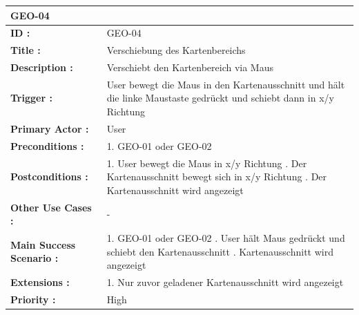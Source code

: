 	\begin{table}[H]
		\begin{tabular}{|p{8cm}|p{8cm}|}
			\hline
			\textbf{GEO-04 } \\ 
			\hline
			\textbf{ID :}\centering & GEO-04  \\ \hline 
			\textbf{Title :}\centering & Verschiebung des Kartenbereichs \\ \hline 
			\textbf{Description :}\centering & Verschiebt den Kartenbereich via Maus \\ \hline 
			\textbf{Trigger :}\centering & User bewegt die Maus in den Kartenausschnitt und hält die linke Maustaste gedrückt und schiebt dann in x/y Richtung  \\ \hline 
			\textbf{Primary Actor :} \centering & User \\ \hline 
			\textbf{Preconditions :}\centering & 
			1. GEO-01 oder GEO-02 \\ \hline 
			\textbf{Postconditions :}\centering & 
			1. User bewegt die Maus in x/y Richtung \newline
			2. Der Kartenausschnitt bewegt sich in x/y Richtung \newline
			3. Der Kartenausschnitt wird angezeigt \\ \hline
			\textbf{Other Use Cases :}\centering & - \\ \hline  
			\textbf{Main Success Scenario :}\centering & 
			1. GEO-01 oder GEO-02 \newline
			2. User hält Maus gedrückt und schiebt den Kartenausschnitt \newline
			3. Kartenausschnitt wird angezeigt \\ \hline  
			\textbf{Extensions :}\centering & 
			1. Nur zuvor geladener Kartenausschnitt wird angezeigt \\ \hline  
			\textbf{Priority :}\centering & High \\ \hline  
		\end{tabular}
	\end{table}
	

